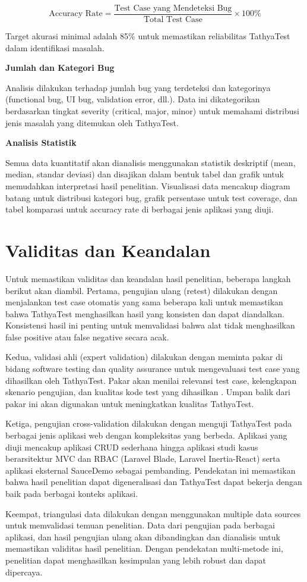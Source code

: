 \begin{equation}
\text{Accuracy Rate} = \frac{\text{Test Case yang Mendeteksi Bug}}{\text{Total Test Case}} \times 100\%
\end{equation}

Target akurasi minimal adalah 85\% untuk memastikan reliabilitas TathyaTest dalam identifikasi masalah.

\textbf{Jumlah dan Kategori Bug}

Analisis dilakukan terhadap jumlah bug yang terdeteksi dan kategorinya (functional bug, UI bug, validation error, dll.). Data ini dikategorikan berdasarkan tingkat severity (critical, major, minor) untuk memahami distribusi jenis masalah yang ditemukan oleh TathyaTest.

\textbf{Analisis Statistik}

Semua data kuantitatif akan dianalisis menggunakan statistik deskriptif (mean, median, standar deviasi) dan disajikan dalam bentuk tabel dan grafik untuk memudahkan interpretasi hasil penelitian. Visualisasi data mencakup diagram batang untuk distribusi kategori bug, grafik persentase untuk test coverage, dan tabel komparasi untuk accuracy rate di berbagai jenis aplikasi yang diuji.

\section{Validitas dan Keandalan}\label{validitas-dan-keandalan}

Untuk memastikan validitas dan keandalan hasil penelitian, beberapa langkah berikut akan diambil. Pertama, pengujian ulang (retest) dilakukan dengan menjalankan test case otomatis yang sama beberapa kali untuk memastikan bahwa TathyaTest menghasilkan hasil yang konsisten dan dapat diandalkan. Konsistensi hasil ini penting untuk memvalidasi bahwa alat tidak menghasilkan false positive atau false negative secara acak.

Kedua, validasi ahli (expert validation) dilakukan dengan meminta pakar di bidang software testing dan quality assurance untuk mengevaluasi test case yang dihasilkan oleh TathyaTest. Pakar akan menilai relevansi test case, kelengkapan skenario pengujian, dan kualitas kode test yang dihasilkan \parencite{wang2023}. Umpan balik dari pakar ini akan digunakan untuk meningkatkan kualitas TathyaTest.

Ketiga, pengujian cross-validation dilakukan dengan menguji TathyaTest pada berbagai jenis aplikasi web dengan kompleksitas yang berbeda. Aplikasi yang diuji mencakup aplikasi CRUD sederhana hingga aplikasi studi kasus berarsitektur MVC dan RBAC (Laravel Blade, Laravel Inertia-React) serta aplikasi eksternal SauceDemo sebagai pembanding. Pendekatan ini memastikan bahwa hasil penelitian dapat digeneralisasi dan TathyaTest dapat bekerja dengan baik pada berbagai konteks aplikasi.

Keempat, triangulasi data dilakukan dengan menggunakan multiple data sources untuk memvalidasi temuan penelitian. Data dari pengujian pada berbagai aplikasi, dan hasil pengujian ulang akan dibandingkan dan dianalisis untuk memastikan validitas hasil penelitian. Dengan pendekatan multi-metode ini, penelitian dapat menghasilkan kesimpulan yang lebih robust dan dapat dipercaya.
